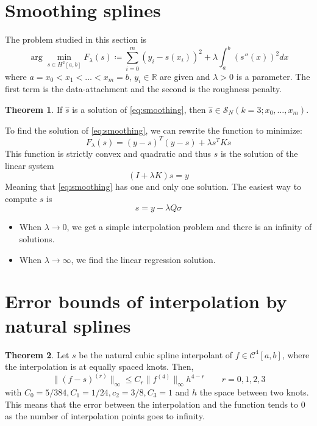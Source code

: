 \documentclass[12pt, openany]{report}
\newcommand{\R}{\mathbb{R}}
\theoremstyle{definition}
\newtheorem{thm}{Theorem}[chapter]
\begin{document}
\section{Smoothing splines}
The problem studied in this section is 
\begin{equation}\label{eq:smoothing}
    \arg\min_{s\in H^2[a,b]}F_{\lambda}(s) \coloneqq \sum_{i=0}^m (y_i-s(x_i))^2 + \lambda \int_a^b (s''(x))^2dx
\end{equation}
where $a=x_0<x_1<\dots<x_m=b$, $y_i\in \R$ are given and $\lambda >0$ is a parameter. The first term is the data-attachment and the second is the roughness penalty.
\begin{thm}
    If $\hat s$ is a solution of \eqref{eq:smoothing}, then $\hat s\in \mathcal{S}_N(k=3;x_0,\dots,x_m)$.
\end{thm}
To find the solution of \eqref{eq:smoothing}, we can rewrite the function to minimize:
\begin{equation}
    F_{\lambda}(s) = (y-s)^T(y-s)+\lambda s^TKs
\end{equation}
This function is strictly convex and quadratic and thus $s$ is the solution of the linear system 
\begin{equation}
    (I+\lambda K)s=y
\end{equation}
Meaning that \eqref{eq:smoothing} has one and only one solution. The easiest way to compute $s$ is 
\begin{equation}
    s = y-\lambda Q\sigma
\end{equation}
\begin{itemize}
    \item When $\lambda \rightarrow 0$, we get a simple interpolation problem and there is an infinity of solutions.
    \item When $\lambda \rightarrow \infty$, we find the linear regression solution.
\end{itemize}
\section{Error bounds of interpolation by natural splines}
\begin{thm}
    Let $s$ be the natural cubic spline interpolant of $f\in \mathcal{C}^4[a,b]$, where the interpolation is at equally spaced knots. Then, 
    \begin{equation}
        \lVert (f-s)^{(r)}\rVert_{\infty} \le C_r \lVert f^{(4)}\rVert_{\infty}h^{4-r} \qquad r=0,1,2,3
    \end{equation}
    with $C_0 = 5/384, C_1 = 1/24,c_2=3/8, C_3=1$ and $h$ the space between two knots. This means that the error between the interpolation and the function tends to 0 as the number of interpolation points goes to infinity.
\end{thm}
\end{document}
